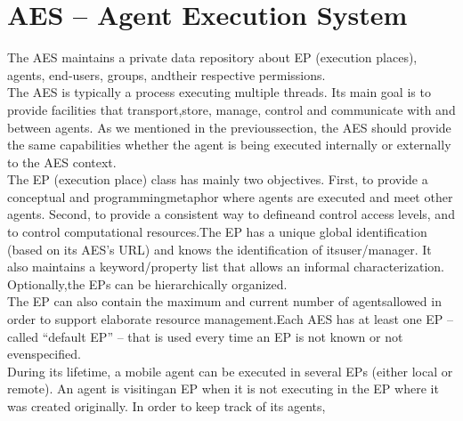 \documentclass{article}
\begin{document}
 \section{AES – Agent Execution System}
 The AES maintains a private data repository about EP (execution places), agents, end-users, groups, andtheir respective permissions.\\The AES is typically a process executing multiple threads. Its main goal is to provide facilities that transport,store, manage, control and communicate with and between agents. As we mentioned in the previoussection, the AES should provide the same capabilities whether the agent is being executed internally or externally to the AES context.\\
 The EP (execution place) class has mainly two objectives. First, to provide a conceptual and programmingmetaphor where agents are executed and meet other agents. Second, to provide a consistent way to defineand control access levels, and to control computational resources.The EP has a unique global identification (based on its AES’s URL) and knows the identification of itsuser/manager. It also maintains a keyword/property list that allows an informal characterization. Optionally,the EPs can be hierarchically organized. \\The EP can also contain the maximum and current number of agentsallowed in order to support elaborate resource management.Each AES has at least one EP – called “default EP” – that is used every time an EP is not known or not evenspecified.\\
 During its lifetime, a mobile agent can be executed in several EPs (either local or remote). An agent is visitingan EP when it is not executing in the EP where it was created originally. In order to keep track of its agents,
\end{document}
